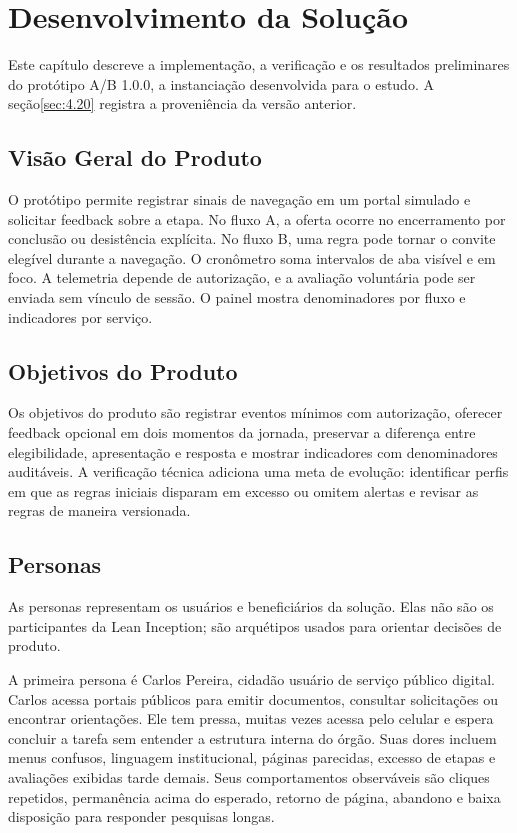 \chapter{Desenvolvimento da Solução}
\label{cap:4}

Este capítulo descreve a implementação, a verificação e os resultados preliminares do protótipo A/B 1.0.0, a instanciação desenvolvida para o estudo. A seção\nobreakspace{}\ref{sec:4.20} registra a proveniência da versão anterior.

\section{Visão Geral do Produto}
\label{sec:4.1}

O protótipo permite registrar sinais de navegação em um portal simulado e solicitar feedback sobre a etapa. No fluxo A, a oferta ocorre no encerramento por conclusão ou desistência explícita. No fluxo B, uma regra pode tornar o convite elegível durante a navegação. O cronômetro soma intervalos de aba visível e em foco. A telemetria depende de autorização, e a avaliação voluntária pode ser enviada sem vínculo de sessão. O painel mostra denominadores por fluxo e indicadores por serviço.

\section{Objetivos do Produto}
\label{sec:4.2}

Os objetivos do produto são registrar eventos mínimos com autorização, oferecer feedback opcional em dois momentos da jornada, preservar a diferença entre elegibilidade, apresentação e resposta e mostrar indicadores com denominadores auditáveis. A verificação técnica adiciona uma meta de evolução: identificar perfis em que as regras iniciais disparam em excesso ou omitem alertas e revisar as regras de maneira versionada.

\section{Personas}
\label{sec:4.3}

As personas representam os usuários e beneficiários da solução. Elas não são os participantes da Lean Inception; são arquétipos usados para orientar decisões de produto.

A primeira persona é Carlos Pereira, cidadão usuário de serviço público digital. Carlos acessa portais públicos para emitir documentos, consultar solicitações ou encontrar orientações. Ele tem pressa, muitas vezes acessa pelo celular e espera concluir a tarefa sem entender a estrutura interna do órgão. Suas dores incluem menus confusos, linguagem institucional, páginas parecidas, excesso de etapas e avaliações exibidas tarde demais. Seus comportamentos observáveis são cliques repetidos, permanência acima do esperado, retorno de página, abandono e baixa disposição para responder pesquisas longas.

